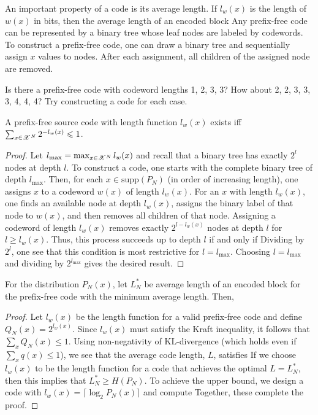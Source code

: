 \documentclass[letterpaper,10pt,english]{article}
\begin{document}
An important property of a code is its average length. 
If $l_w(x)$ is the length of $w(x)$ in bits, then the average length of an encoded block 
Any prefix-free code can be represented by a binary tree whose leaf nodes are labeled by codewords. 
To construct a prefix-free code, one can draw a binary tree and sequentially assign $x$ values to nodes. 
After each assignment, all children of the assigned node are removed.
\begin{exerc} 
Is there a prefix-free code with codeword lengths 1, 2, 3, 3? How about 2, 2, 3, 3, 3, 4, 4, 4? 
Try constructing a code for each case.
\end{exerc}
\begin{lem}  
A prefix-free source code with length function $l_w(x)$ exists iff $\sum_{x \in \mathscr{X}^N}2^{-l_w(x)} \leqslant 1$. 
\end{lem} 
\begin{proof}
Let $l_{\max} = \max_{x \in \mathscr{X}^N} l_w(x)$ and recall that a binary tree has exactly $2^l$ nodes at depth $l$. 
To construct a code, one starts with the complete binary tree of depth $l_{\max}$. 
Then, for each $x \in \text{supp}(P_N)$ (in order of increasing length), one assigns $x$ to a codeword $w(x)$ of length $l_w(x)$. 
For an $x$ with length $l_w(x)$, one finds an available node at depth $l_w(x)$, assigns the binary label of that node to $w(x)$, 
and then removes all children of that node. 
Assigning a codeword of length $l_w(x)$ removes exactly $2^{l-l_w(x)}$ nodes at depth $l$ for $l \ge l_w(x)$. 
Thus, this process succeeds up to depth $l$ if and only if 
Dividing by $2^l$, one see that this condition is most restrictive for $l = l_{\max}$. 
Choosing $l = l_{\max}$ and dividing by $2^{l_{\max}}$ gives the desired result.
\end{proof}
\begin{thm} 
For the distribution $P_N(x)$, let $L_N^{\ast}$ be average length of an encoded block for the prefix-free code with the minimum average length. 
Then,
\end{thm} 
\begin{proof} 
Let $l_w(x)$ be the length function for a valid prefix-free code and define $Q_N(x) = 2^{l_w(x)}$. 
Since $l_w(x)$ must satisfy the Kraft inequality, it follows that $\sum_x Q_N(x) \le 1$. 
Using non-negativity of KL-divergence (which holds even if $\sum_x q(x) \le 1$), 
we see that the average code length, $L$, satisfies
If we choose $l_w(x)$ to be the length function for a code that achieves the optimal $L = L^{\ast}_N$, then this implies that $L^{\ast}_N \ge H (P_N)$. 
To achieve the upper bound, we design a code with $l_w (x) = \lceil \log_2 P_N (x)\rceil$ and compute
Together, these complete the proof.
\end{proof} 
\end{document}
